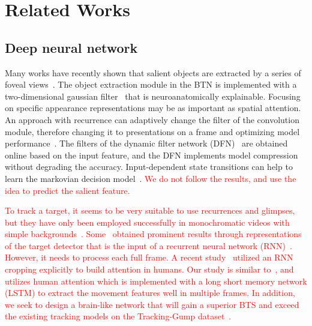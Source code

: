 \documentclass[final,3p,times,twocolumn]{elsarticle}
\begin{document}
\section{Related Works} 

\subsection{Deep neural network}\par
Many works have recently shown that salient objects are extracted by a series of foveal views~\cite{mnih2014recurrent,draw}.
The object extraction module in the BTN is implemented with a two-dimensional gaussian filter~\cite{RATM} that is neuroanatomically explainable.
Focusing on specific appearance representations may be as important as spatial attention. 
An approach with recurrence can adaptively change the filter of the convolution module, therefore changing it to presentations on a frame and optimizing model performance~\cite{stollenga2014deep}. 
The filters of the dynamic filter network (DFN)~\cite{brabandere2016dynamic} are obtained online based on the input feature, and the DFN implements model compression without degrading the accuracy. 
Input-dependent state transitions can help to learn the markovian decision model~\cite{karl2017deep}. 
\textcolor{red}{
We do not follow the results, and use the idea to predict the salient feature.} 


\textcolor{red}{
To track a target, it seems to be very suitable to use recurrences and glimpses, but they have only been employed successfully in monochromatic videos with simple backgrounds~\cite{RATM}. 
Some~\cite{ning2017spatially} obtained prominent results through representations of the target detector that is the input of a recurrent neural network (RNN)~\cite{su2020improved}.
However, it needs to process each full frame. 
A recent study~\cite{gordon2017re3} utilized an RNN cropping explicitly to build attention in humans. 
Our study is similar to~\cite{RATM,luo2019teleoperation}, and utilizes human attention which is implemented with a long short memory network (LSTM) to extract the movement features well in multiple frames. 
In addition, we seek to design a brain-like network that will gain a superior BTS and exceed the existing tracking models on the Tracking-Gump dataset~\cite{gaze_forrest}.
}\par
\end{document}
